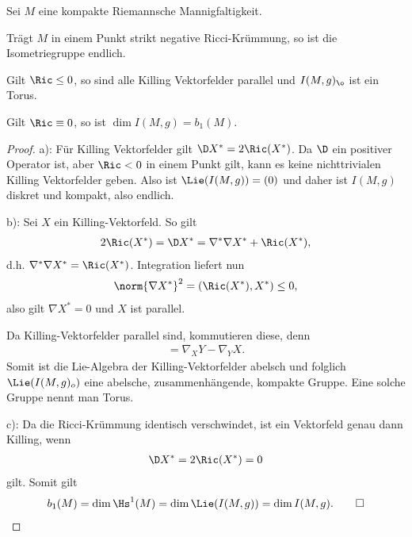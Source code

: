 \documentclass[%
	paper=a5,%
	fleqn,%
	DIV=18,%
	BCOR=0mm,
	fontsize=11pt,
	titlepage=false,%
	bibliography=totoc,
	DIV=18,%
	twoside=true,
	pdftitle=Riemannsche Geometrie,
	pdfauthor=Uwe Semmelmann,
	numbers=noendperiod]%
	{scrbook}
\begin{document}
\begin{cor}
Sei $M$ eine kompakte Riemannsche Mannigfaltigkeit.
\begin{propenum}
\item Trägt $M$ in einem Punkt strikt negative Ricci-Krümmung, so ist die Isometriegruppe endlich.
\item Gilt $\Ric \le 0$, so sind alle Killing Vektorfelder parallel und $I(M,g)_{\o}$ ist ein Torus.
\item Gilt $\Ric \equiv 0$, so ist $\dim I(M,g) = b_{1}(M)$.\fish
\end{propenum}
\end{cor}
\begin{proof}
a): Für Killing Vektorfelder gilt $\D X^* = 2\Ric(X^*)$. Da $\D$ ein positiver Operator ist, aber $\Ric < 0$ in einem Punkt gilt, kann es keine nichttrivialen Killing Vektorfelder geben. Also ist $\Lie(I(M,g)) = (0)$ und daher ist $I(M,g)$ diskret und kompakt, also endlich.

b): Sei $X$ ein Killing-Vektorfeld. So gilt
\begin{align*}
2\Ric(X^*) = \D X^* = \nabla^*\nabla X^* + \Ric(X^*),
\end{align*}
d.h. $\nabla^*\nabla X^* = \Ric(X^*)$. Integration liefert nun
\begin{align*}
\norm{\nabla X^*}^2 = (\Ric(X^*),X^*) \le 0,
\end{align*}
also gilt $\nabla X^* = 0$ und $X$ ist parallel.

Da Killing-Vektorfelder parallel sind, kommutieren diese, denn
\begin{align*}
[X,Y] = \nabla_{X}Y - \nabla_{Y}X.
\end{align*}
Somit ist die Lie-Algebra der Killing-Vektorfelder abelsch und folglich $\Lie(I(M,g)_{o})$ eine abelsche, zusammenhängende, kompakte Gruppe. Eine solche Gruppe nennt man Torus.

c): Da die Ricci-Krümmung identisch verschwindet, ist ein Vektorfeld genau dann Killing, wenn
\begin{align*}
\D X^* = 2\Ric(X^*) = 0
\end{align*}
gilt. Somit gilt
\begin{align*}
b_{1}(M) = \dim\Hs^1(M) = \dim\Lie(I(M,g)) = \dim I(M,g).\qed
\end{align*}
\end{proof}

\printindex



\end{document}
